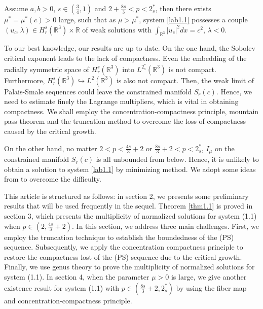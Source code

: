 \documentclass[reqno]{amsart}
\begin{document}
\begin{theorem}\label{thm1.2}
Assume $a,b>0$, $s\in(\frac{3}{4},1)$ and $2+\frac{8s}{3}<p<2^*_s$, then there exists
$\mu^*=\mu^*(c)>0$ large, such that as $\mu>\mu^*$, system \eqref{lab1.1}
possesses a couple $(u_c, \lambda)\in H^s_r(\mathbb{R}^3)\times \mathbb{R}$ of weak
solutions with $\int_{\mathbb{R}^3}|u_c|^2dx=c^2$, $\lambda<0$.
\end{theorem}

\begin{remark}\rm
To our best knowledge, our results are up to date. On the one hand,
the Sobolev critical exponent leads to the lack of compactness.
Even the embedding of the radially symmetric space of $H^s_r(\mathbb{R}^3)$ into
$L^{2^*_s}(\mathbb{R}^3)$ is not compact. Furthermore,
$H^s_r(\mathbb{R}^3)\hookrightarrow L^2(\mathbb{R}^3)$ is also not compact.
Then, the weak limit of Palais-Smale sequences could leave the constrained manifold
$S_r(c)$. Hence, we need to estimate finely the Lagrange multipliers, which is vital
in obtaining compactness. We shall employ the concentration-compactness principle,
mountain pass theorem and the truncation method to overcome the loss of compactness
caused by the critical growth.

On the other hand, no matter $2<p<{\frac{4s}{3}+2}$ or $\frac{8s}{3}+2<p<2^*_s$,
$I_\mu$ on the constrained manifold $S_r(c)$ is all unbounded from below.
Hence, it is unlikely to obtain a solution to system \eqref{lab1.1} by minimizing
method. We adopt some ideas from \cite{A5878} to overcome the difficulty.
\end{remark}

This article is structured as follows:
in section 2, we presents some preliminary results that will be  used frequently
 in the sequel.
Theorem \ref{thm1.1} is proved in section 3, which presents the multiplicity of
normalized solutions for system (1.1) when $p\in(2, \frac{4s}{3}+2)$.
In this section, we address three main challenges. First, we employ the truncation
technique to establish the boundedness of the (PS) sequence. Subsequently, we apply
the concentration compactness principle to restore the compactness lost of
the (PS) sequence due to the critical growth. Finally, we use genus theory to prove
the multiplicity of normalized solutions for system (1.1).
In section 4, when the parameter $\mu>0$ is large, we give another existence result
for system (1.1) with $p\in( \frac{8s}{3}+2, 2^*_s)$ by using the fiber map and
concentration-compactness principle.
\end{document}
